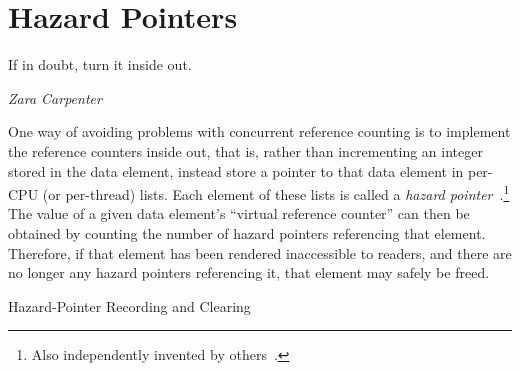 
\section{Hazard Pointers}
\label{sec:defer:Hazard Pointers}
%
\epigraph{If in doubt, turn it inside out.}{\emph{Zara Carpenter}}

One way of avoiding problems with concurrent reference counting
is to implement the reference counters
inside out, that is, rather than incrementing an integer stored in the
data element, instead store a pointer to that data element in
per-CPU (or per-thread) lists.
Each element of these lists is called a
\emph{hazard pointer}~\cite{MagedMichael04a}.\footnote{
	Also independently invented by others~\cite{HerlihyLM02}.}
The value of a given data element's ``virtual reference counter'' can
then be obtained by counting the number of hazard pointers referencing
that element.
Therefore, if that element has been rendered inaccessible to readers,
and there are no longer any hazard pointers referencing it, that element
may safely be freed.

\begin{listing}

\caption{Hazard-Pointer Recording and Clearing}
\label{lst:defer:Hazard-Pointer Recording and Clearing}
\end{listing}

